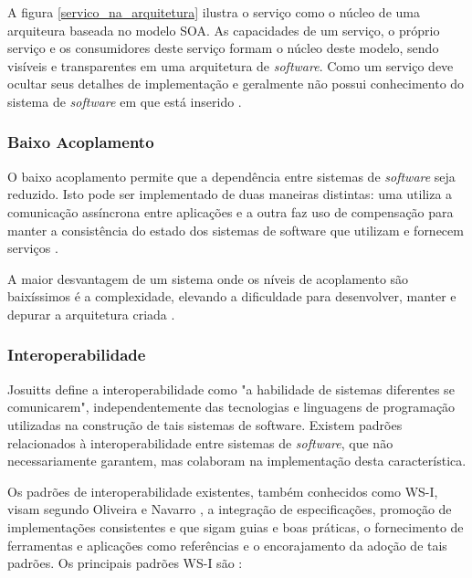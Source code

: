 A figura \ref{servico_na_arquitetura} ilustra o serviço como o núcleo de uma arquiteura baseada no modelo SOA. As capacidades de um serviço, o próprio serviço e os consumidores deste serviço formam o núcleo deste modelo, sendo visíveis e transparentes em uma arquitetura de \textit{software}. Como um serviço deve ocultar seus detalhes de implementação e geralmente não possui conhecimento do sistema de \textit{software} em que está inserido \cite{nickull_service_2007}.

\subsubsection{Baixo Acoplamento}
O baixo acoplamento permite que a dependência entre sistemas de \textit{software} seja reduzido. Isto pode ser implementado de duas maneiras distintas: uma utiliza a comunicação assíncrona entre aplicações e a outra faz uso de compensação para manter a consistência do estado dos sistemas de software que utilizam e fornecem serviços \cite{josuttis_soa_2007}.

A maior desvantagem de um sistema onde os níveis de acoplamento são baixíssimos é a complexidade, elevando a dificuldade para desenvolver, manter e depurar a arquitetura criada \cite{josuttis_soa_2007}.

\subsubsection{Interoperabilidade}
Josuitts \cite{josuttis_soa_2007} define a interoperabilidade como "a habilidade de sistemas diferentes se comunicarem", independentemente das tecnologias e linguagens de programação utilizadas na construção de tais sistemas de software. Existem padrões relacionados à interoperabilidade entre sistemas de \textit{software}, que não necessariamente garantem, mas colaboram na implementação desta característica. 

Os padrões de interoperabilidade existentes, também conhecidos como WS-I, visam segundo Oliveira e Navarro \cite{oliveira_interoperabilidade}, a integração de especificações, promoção de implementações consistentes e que sigam guias e boas práticas, o fornecimento de ferramentas e aplicações como referências e o encorajamento da adoção de tais padrões. Os principais padrões WS-I são \cite{oliveira_interoperabilidade}:

